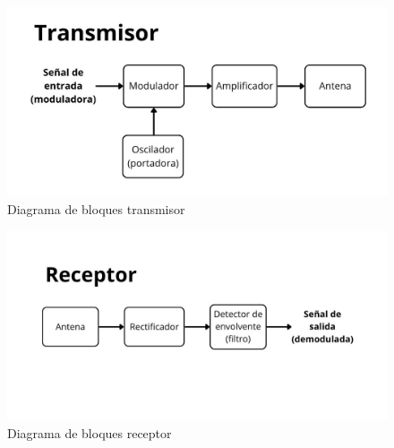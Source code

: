 \begin{figure}[h!]
    \centering
    \includegraphics[width=0.75\linewidth]{img/transmisor.jpg}
    \caption{Diagrama de bloques transmisor}
    \label{fig:bloques_transmisor}
\end{figure}

\begin{figure}[h!]
    \centering
    \includegraphics[width=0.75\linewidth]{img/receptor.jpg}
    \caption{Diagrama de bloques receptor}
    \label{fig:bloques_receptor}
\end{figure}